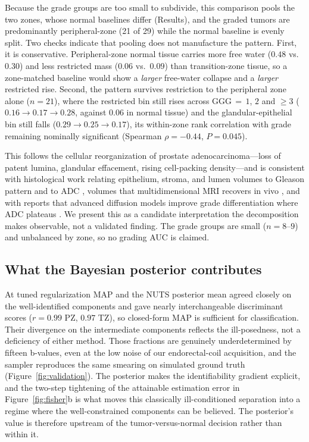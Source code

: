 Because the grade groups are too small to subdivide, this comparison pools the two zones, whose normal baselines differ (Results), and the graded tumors are predominantly peripheral-zone (21 of 29) while the normal baseline is evenly split. Two checks indicate that pooling does not manufacture the pattern. First, it is conservative. Peripheral-zone normal tissue carries more free water ($0.48$ vs.\ $0.30$) and less restricted mass ($0.06$ vs.\ $0.09$) than transition-zone tissue, so a zone-matched baseline would show a \emph{larger} free-water collapse and a \emph{larger} restricted rise. Second, the pattern survives restriction to the peripheral zone alone ($n = 21$), where the restricted bin still rises across GGG\,$=\,1$, $2$ and $\geq 3$ ($0.16 \to 0.17 \to 0.28$, against $0.06$ in normal tissue) and the glandular-epithelial bin still falls ($0.29 \to 0.25 \to 0.17$), its within-zone rank correlation with grade remaining nominally significant (Spearman $\rho = -0.44$, $P = 0.045$).

This follows the cellular reorganization of prostate adenocarcinoma---loss of patent lumina, glandular effacement, rising cell-packing density---and is consistent with histological work relating epithelium, stroma, and lumen volumes to Gleason pattern and to ADC \citep{chatterjee2015changes}, volumes that multidimensional MRI recovers in vivo \citep{chatterjee2022validation}, and with reports that advanced diffusion models improve grade differentiation where ADC plateaus \citep{johnston2019verdict, he2025improved}.
We present this as a candidate interpretation the decomposition makes observable, not a validated finding. The grade groups are small ($n = 8$--$9$) and unbalanced by zone, so no grading AUC is claimed.

\subsection{What the Bayesian posterior contributes}
At tuned regularization MAP and the NUTS posterior mean agreed closely on the well-identified components and gave nearly interchangeable discriminant scores ($r = 0.99$ PZ, $0.97$ TZ), so closed-form MAP is sufficient for classification.
Their divergence on the intermediate components reflects the ill-posedness, not a deficiency of either method. Those fractions are genuinely underdetermined by fifteen b-values, even at the low noise of our endorectal-coil acquisition, and the sampler reproduces the same smearing on simulated ground truth (Figure~\ref{fig:validation}).
The posterior makes the identifiability gradient explicit, and the two-step tightening of the attainable estimation error in Figure~\ref{fig:fisher}b is what moves this classically ill-conditioned separation \citep{jalnefjord2019optimization} into a regime where the well-constrained components can be believed. The posterior's value is therefore upstream of the tumor-versus-normal decision rather than within it.

